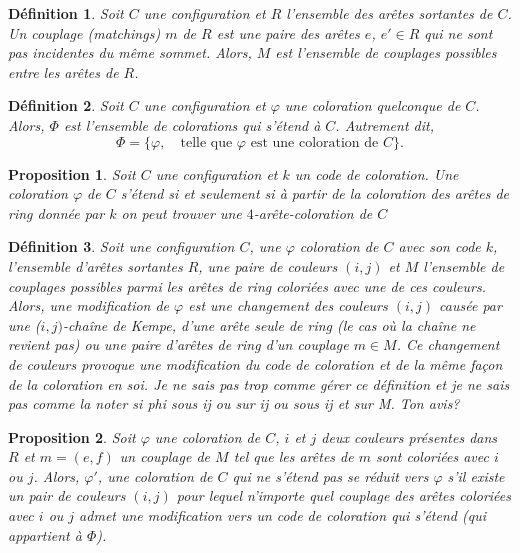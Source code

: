 \documentclass[10pt,a4paper]{article}
\newtheorem{definition}{Définition}
\newtheorem{proposition}{Proposition}
\begin{document}
\begin{definition}
Soit $C$ une configuration et $R$ l'ensemble des arêtes sortantes de $C$. Un \emph{couplage} (matchings) $m$ de $R$ est une paire des arêtes $e$, $e' \in R$ qui ne sont pas incidentes du même sommet. Alors, $M$ est l'ensemble de \emph{couplages} possibles entre les arêtes de $R$.
\label{de:coup}
\end{definition}

\begin{definition}
Soit $C$ une configuration et $\varphi$ une coloration quelconque de $C$. Alors, $\Phi$ est l'ensemble de colorations qui s'étend à $C$. Autrement dit,
$$
\Phi = \lbrace \varphi, \quad \textrm{telle que $\varphi$ est une coloration de $C$} \rbrace.
$$
\label{de:phi}
\end{definition}

\begin{proposition}
Soit $C$ une configuration et $k$ un code de coloration. Une coloration $\varphi$ de $C$ \emph{s'étend} si et seulement si à partir de la coloration des arêtes de ring donnée par $k$ on peut trouver une $4$-arête-coloration de $C$
\label{pro:étend}
\end{proposition}

\begin{definition}
Soit une configuration $C$, une $\varphi$ coloration de $C$ avec son code $k$, l'ensemble d'arêtes sortantes $R$, une paire de couleurs $(i,j)$ et $M$ l'ensemble de couplages possibles parmi les arêtes de ring coloriées avec une de ces couleurs. Alors, une \emph{modification} de $\varphi$ est une changement des couleurs $(i,j)$ causée par une ($i,j)$-chaîne de Kempe, d'une arête seule de ring (le cas où la chaîne ne revient pas) ou une paire d'arêtes de ring  d'un couplage $m \in M$. Ce changement de couleurs provoque une modification du code de coloration et de la même façon de la coloration en soi.
{\color{red} Je ne sais pas trop comme gérer ce définition et je ne sais pas comme la noter si phi sous ij ou sur ij ou sous ij et sur M. Ton avis?}
\label{de:modif}
\end{definition}

\begin{proposition}
Soit $\varphi$ une coloration de $C$, $i$ et $j$ deux couleurs présentes dans $R$ et $m = (e,f)$ un couplage de $M$ tel que les arêtes de $m$ sont coloriées avec $i$ ou $j$. Alors, $\varphi'$, une coloration de $C$ qui ne s'étend pas \emph{se réduit} vers  $\varphi$ s'il existe un pair de couleurs $(i,j)$ pour lequel n'importe quel couplage des arêtes coloriées avec $i$ ou $j$ admet une modification vers un code de coloration qui s'étend (qui appartient à $\Phi$).
\label{pro:phii}
\end{proposition}
\end{document}
